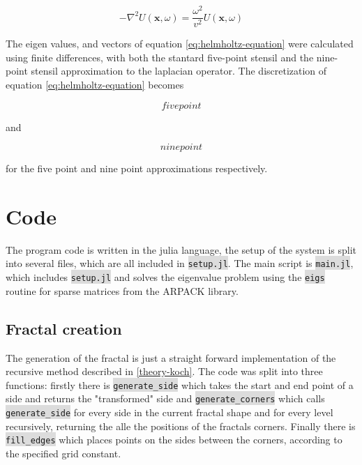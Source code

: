 \documentclass{article}
\begin{document}
\begin{equation}
    -\nabla^2U(\textbf{x}, \omega) = \frac{\omega^2}{v^2}U(\textbf{x}, \omega)
    \label{eq:helmholtz-equation}
\end{equation}

The eigen values, and vectors of equation \ref{eq:helmholtz-equation} were calculated using finite differences, with both the stantard five-point stensil and the nine-point stensil approximation to the laplacian operator. The discretization of equation \ref{eq:helmholtz-equation} becomes

\begin{equation}
    five point
    \label{eq:five-point}
\end{equation}

and

\begin{equation}
    nine point
    \label{eq:five-point}
\end{equation}

for the five point and nine point approximations respectively.

\section{Code}
The program code is written in the julia language, the setup of the system is split into several files, which are all included in \colorbox{gainsboro}{\lstinline{setup.jl}}. The main script is \colorbox{gainsboro}{\lstinline{main.jl}}, which includes \colorbox{gainsboro}{\lstinline{setup.jl}} and solves the eigenvalue problem using the \colorbox{gainsboro}{\lstinline{eigs}} routine for sparse matrices from the ARPACK library.\\

\subsection{Fractal creation}\label{code:fractal}
The generation of the fractal is just a straight forward implementation of the recursive method described in \ref{theory-koch}. The code was split into three functions: firstly there is \colorbox{gainsboro}{\lstinline{generate_side}} which takes the start and end point of a side and returns the "transformed" side and \colorbox{gainsboro}{\lstinline{generate_corners}} which calls \colorbox{gainsboro}{\lstinline{generate_side}} for every side in the current fractal shape and for every level recursively, returning the alle the positions of the fractals corners.
Finally there is \colorbox{gainsboro}{\lstinline{fill_edges}} which places points on the sides between the corners, according to the specified grid constant.\\
\end{document}
